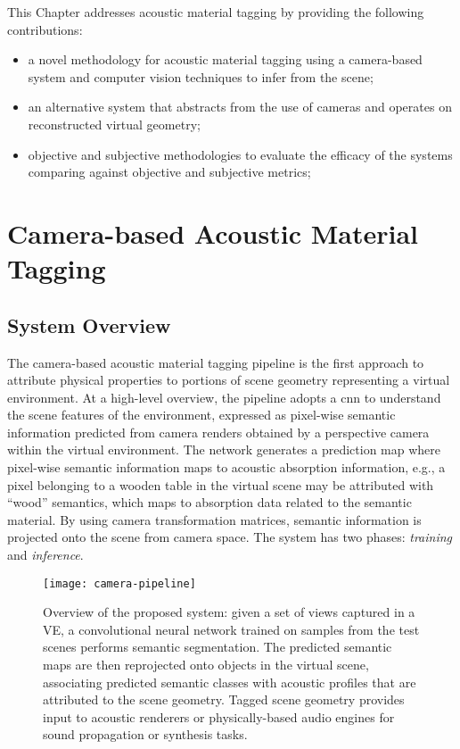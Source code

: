 This Chapter addresses acoustic material tagging by providing the following contributions:
\begin{itemize}
    \item a novel methodology for acoustic material tagging using a camera-based system and computer vision techniques to infer from the scene;
    \item an alternative system that abstracts from the use of cameras and operates on reconstructed virtual geometry;
    \item objective and subjective methodologies to evaluate the efficacy of the systems comparing against objective and subjective metrics;
\end{itemize}


\section{Camera-based Acoustic Material Tagging}\label{sec:camera-tagging}
\subsection{System Overview}
The camera-based acoustic material tagging pipeline is the first approach to attribute physical properties to portions of scene geometry representing a virtual environment. At a high-level overview, the pipeline adopts a \acrfull{cnn} to understand the scene features of the environment, expressed as pixel-wise semantic information predicted from camera renders obtained by a perspective camera within the virtual environment. The network generates a prediction map where pixel-wise semantic information maps to acoustic absorption information, e.g., a pixel belonging to a wooden table in the virtual scene may be attributed with ``wood'' semantics, which maps to absorption data related to the semantic material. By using camera transformation matrices, semantic information is projected onto the scene from camera space. The system has two phases: \emph{training} and \emph{inference}.
\begin{figure}[htbp]
    \centering
    \texttt{[image: camera-pipeline]}
    \caption[Camera-based acoustic material tagging system overview]{Overview of the proposed system: given a set of views captured in a VE, a convolutional neural network trained on samples from the test scenes performs semantic segmentation. The predicted semantic maps are then reprojected onto objects in the virtual scene, associating predicted semantic classes with acoustic profiles that are attributed to the scene geometry. Tagged scene geometry provides input to acoustic renderers or physically-based audio engines for sound propagation or synthesis tasks.}
    \label{fig:cog-pipeline}
\end{figure}

